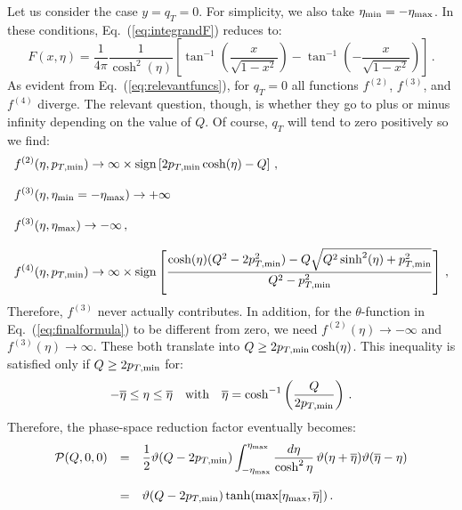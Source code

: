 \documentclass[10pt,a4paper]{article}
\begin{document}
Let us consider the case $y=q_T=0$. For simplicity, we also take
$\eta_{\rm min} = -\eta_{\rm max}$. In these conditions,
Eq.~(\ref{eq:integrandF}) reduces to:
\begin{equation}\label{eq:F00}
F(x,\eta)=\displaystyle \frac{1}{4\pi}\frac{1}{\cosh^2(\eta)}\left[\tan^{-1}\left(\frac{
    x}{\sqrt{1-x^2}}\right)-\displaystyle\tan^{-1}\left(-\frac{
    x}{\sqrt{1-x^2}}\right)\right]\,.
\end{equation}
As evident from Eq.~(\ref{eq:relevantfuncs}), for $q_T=0$ all
functions $f^{(2)}$, $f^{(3)}$, and $f^{(4)}$ diverge. The relevant
question, though, is whether they go to plus or minus infinity
depending on the value of $Q$. Of course, $q_T$ will tend to zero
positively so we find:
\begin{equation}
\begin{array}{l}
\displaystyle f^{(2)}(\eta,p_{T,\rm min})\rightarrow \infty\times\mbox{sign}\left[2 p_{T,\rm min}\cosh(\eta)-Q\right]\,,\\
\\
\displaystyle f^{(3)}(\eta,\eta_{\rm min}= -\eta_{\rm max}) \rightarrow +\infty\\
\\
\displaystyle f^{(3)}(\eta,\eta_{\rm max}) \rightarrow -\infty\,,\\
\\
\displaystyle f^{(4)}(\eta,p_{T,\rm min}) \rightarrow \infty\times\mbox{sign}\left[\frac{\cosh(\eta)(Q^2 - 2
                    p_{T,\rm min}^{2})- Q\sqrt{Q^{2} \sinh^{2}(\eta) + p_{T,\rm min}^{2} }}{Q^{2} - p_{T,\rm min}^{2}}\right]\,, 
\end{array}
\end{equation}
Therefore, $f^{(3)}$ never actually contributes. In addition, for the
$\theta$-function in Eq.~(\ref{eq:finalformula}) to be different from
zero, we need $f^{(2)}(\eta)\rightarrow -\infty$ and
$f^{(3)}(\eta)\rightarrow \infty$. These both translate into
$Q\geq 2 p_{T,\rm min}\cosh(\eta)$. This inequality is satisfied only
if $Q\geq 2p_{T,\rm min}$ for:
\begin{equation}\label{eq:etabardef}
-\overline{\eta}\leq\eta\leq \overline{\eta}\quad\mbox{with}\quad \overline{\eta} =\cosh^{-1}\left(\frac{Q}{2p_{T,\rm min}}\right)\,.
\end{equation}
Therefore, the phase-space reduction factor eventually becomes:
\begin{equation}
\begin{array}{rcl}
  \mathcal{P}(Q,0,0)&=&\displaystyle\frac12\vartheta(Q- 2p_{T,\rm min})\displaystyle \int_{-\eta_{\rm
      max}}^{\eta_{\rm
      max}}\frac{d\eta}{\cosh^2\eta}\,\vartheta(\eta+\overline{\eta})
  \vartheta(\overline{\eta}-\eta)\\
\\
&=&\displaystyle\vartheta(Q- 2p_{T,\rm
    min})\tanh(\mbox{max}[\eta_{\rm max},\overline{\eta}])\,.
\end{array}
\end{equation}
\end{document}

